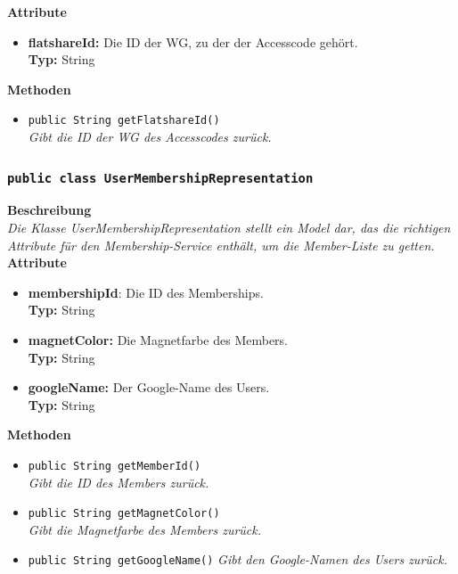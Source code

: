 \documentclass[a4paper]{scrreprt}
\begin{document}
	\textbf{Attribute}
	\begin{itemize}
		\item \textbf{flatshareId:} Die ID der WG, zu der der Accesscode gehört. \\
		\textbf{Typ:} String
	\end{itemize}
	
	\textbf{Methoden}
	\begin{itemize}
		\item{\texttt{public String getFlatshareId()}}\\
		\textit{Gibt die ID der WG des Accesscodes zurück.}\\
	\end{itemize}
	\subsubsection{\texttt{public class UserMembershipRepresentation}}
	\textbf{Beschreibung} \\
	\textit{Die Klasse UserMembershipRepresentation stellt ein Model dar, das die richtigen Attribute für den Membership-Service enthält, um die Member-Liste zu getten.} \\
	
	\textbf{Attribute}
	\begin{itemize}
		\item \textbf{membershipId}: Die ID des Memberships. \\
		\textbf{Typ:} String
		
		\item \textbf{magnetColor:} Die Magnetfarbe des Members. \\
		\textbf{Typ:} String
		
		\item \textbf{googleName:} Der Google-Name des Users.\\
		\textbf{Typ:} String
	\end{itemize}
	
	\textbf{Methoden}
	\begin{itemize}
		\item{\texttt{public String getMemberId()}}\\
		\textit{Gibt die ID des Members zurück.}\\
		\item{\texttt{public String getMagnetColor()}}\\
		\textit{Gibt die Magnetfarbe des Members zurück.}\\
		\item{\texttt{public String getGoogleName()}}
		\textit{Gibt den Google-Namen des Users zurück.}
	\end{itemize}
\end{document}
